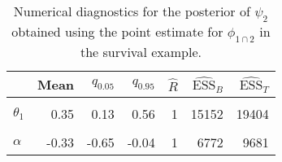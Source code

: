 \begin{table}

\caption{Numerical diagnostics for the posterior of $\psi_{2}$ obtained using the point estimate for $\phi_{1 \cap 2}$ in the survival example.}
\centering
\begin{tabular}[t]{lrrrrrr}
\toprule
  & Mean & $q_{0.05}$ & $q_{0.95}$ & $\widehat{R}$ & $\widehat{\text{ESS}}_{B}$ & $\widehat{\text{ESS}}_{T}$\\
\midrule
\cellcolor{gray!6}{$\theta_{0}$} & \cellcolor{gray!6}{-0.06} & \cellcolor{gray!6}{-0.84} & \cellcolor{gray!6}{0.70} & \cellcolor{gray!6}{1} & \cellcolor{gray!6}{6945} & \cellcolor{gray!6}{9860}\\
$\theta_{1}$ & 0.35 & 0.13 & 0.56 & 1 & 15152 & 19404\\
\cellcolor{gray!6}{$\gamma$} & \cellcolor{gray!6}{11.97} & \cellcolor{gray!6}{10.34} & \cellcolor{gray!6}{13.58} & \cellcolor{gray!6}{1} & \cellcolor{gray!6}{23230} & \cellcolor{gray!6}{21721}\\
$\alpha$ & -0.33 & -0.65 & -0.04 & 1 & 6772 & 9681\\
\bottomrule
\end{tabular}
\end{table}